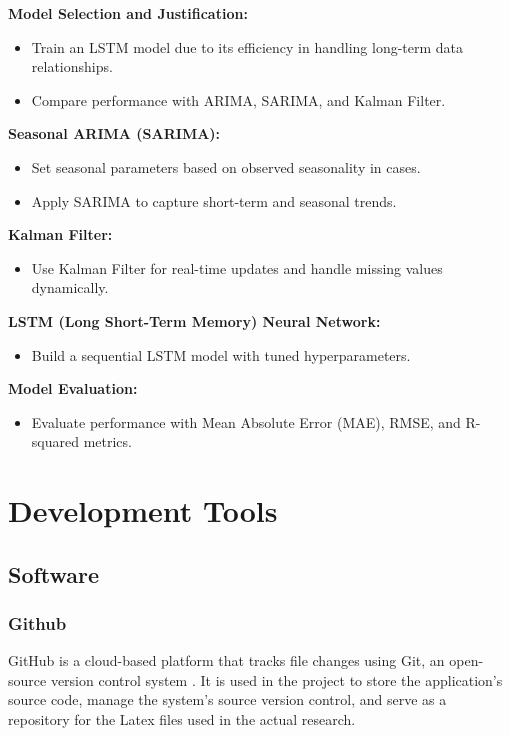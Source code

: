 \textbf{Model Selection and Justification:}
\begin{itemize}
	\item Train an LSTM model due to its efficiency in handling long-term data relationships.
	\item Compare performance with ARIMA, SARIMA, and Kalman Filter.
\end{itemize}

\textbf{Seasonal ARIMA (SARIMA):}
\begin{itemize}
	\item Set seasonal parameters based on observed seasonality in cases.
	\item Apply SARIMA to capture short-term and seasonal trends.
\end{itemize}

\textbf{Kalman Filter:}
\begin{itemize}
	\item Use Kalman Filter for real-time updates and handle missing values dynamically.
\end{itemize}

\textbf{LSTM (Long Short-Term Memory) Neural Network:}
\begin{itemize}
	\item Build a sequential LSTM model with tuned hyperparameters.
\end{itemize}

\textbf{Model Evaluation:}
\begin{itemize}
	\item Evaluate performance with Mean Absolute Error (MAE), RMSE, and R-squared metrics.
\end{itemize}

\section{Development Tools}
\subsection{Software}

\subsubsection{Github}
GitHub is a cloud-based platform that tracks file changes using Git, an open-source version control system \cite{github-no-date}. It is used in the project to store the application's source code, manage the system's source version control, and serve as a repository for the Latex files used in the actual research.

